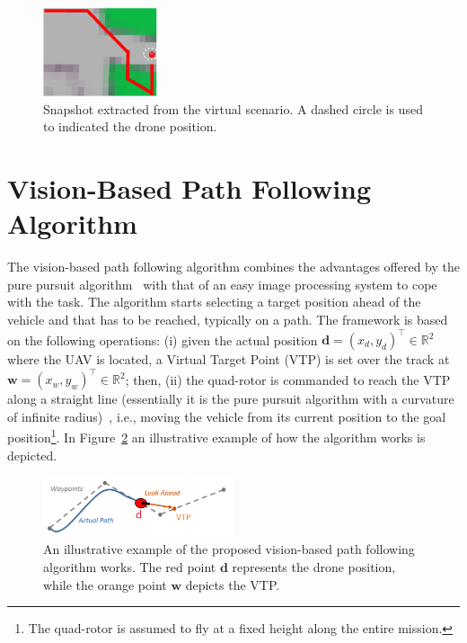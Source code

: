 \documentclass[a4paper,twocolumn,10pt]{article}
\begin{document}
    \begin{figure}
        \centering
        \includegraphics[width=0.3\textwidth]{pics/fig2_track.png}
        \caption{Snapshot extracted from the virtual scenario. A dashed circle is used to indicated the drone position.}
        \label{fig:arena}
    \end{figure}

    \section{Vision-Based Path Following Algorithm}
    \label{sec:purPursuitTrackingAlgorithm}

    The vision-based path following algorithm combines the advantages offered by the pure pursuit 
    algorithm~\cite{14_coulter1992implementation} with that of an easy image processing system to cope 
    with the task. The algorithm starts selecting a target position ahead of the vehicle and that has 
    to be reached, typically on a path. The framework is based on the following operations: (i) given 
    the actual position $\mathbf{d}=(x_d, y_d)^\top \in \mathbb{R}^2$ where the UAV is located, 
    a Virtual Target Point (VTP)  is set over the track at $\mathbf{w}=(x_w, y_w)^\top \in \mathbb{R}^2$; then, (ii) the 
    quad-rotor is commanded to reach the VTP along a straight line (essentially it is the pure 
    pursuit algorithm with a curvature of infinite radius)~\cite{14_coulter1992implementation}, i.e., 
    moving the vehicle from its current position to the goal position\footnote{The quad-rotor is assumed to fly at a fixed height along the entire mission.}. In Figure~\ref{fig:pure pursuit} an illustrative example of how the algorithm works is depicted. 

    \begin{figure}
        \centering
        \includegraphics[width=0.5\textwidth]{pics/fig3_path.png}
        \caption{An illustrative example of the proposed vision-based path following algorithm works. 
        The red point $\mathbf{d}$ represents the drone position, while the orange point $\mathbf{w}$ 
        depicts the VTP.}
        \label{fig:pure pursuit}
    \end{figure}
\end{document}
